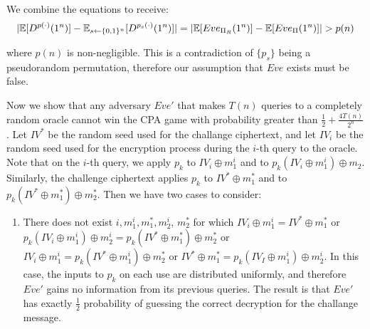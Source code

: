 \documentclass{article}
\begin{document}
\begin{enumerate}
\begin{enumerate}[,label=\alph*.]
We combine the equations to receive:%
\noindent\noindent\[%
|\E[D^{p(\cdot)}(1^n)] -  \E_{s \gets \zo^n}[D^{p_s(\cdot)}(1^n)] | = |\E[Eve_{\Pi_R}(1^n)] - \E[Eve_{\Pi}(1^n)] | > p(n)
\]%

where $p(n)$ is non-negligible. This is a contradiction of $\{p_s\}$ being a pseudorandom 
permutation, therefore our assumption that $Eve$ exists must be false.%

Now we show that any adversary $Eve'$ that makes $T(n)$ queries to a completely random oracle cannot
win the CPA game with probability greater than $\frac{1}{2} + \frac{4 T(n)}{2^n}$. Let $IV^*$ be the
random seed used for the challange ciphertext, and let $IV_i$ be the random seed used for the 
encryption process during the $i$-th query to the oracle. Note that on the $i$-th query, we apply
$p_k$ to $IV_i \oplus m^i_1$ and to $p_k(IV_i \oplus m^i_1) \oplus m_2$. Similarly, the challenge ciphertext
applies $p_k$ to $IV^* \oplus m_1^*$ and to $p_k(IV^* \oplus m_1^*) \oplus m_2^*$. Then we have two cases
to consider:%

\begin{enumerate}[noitemsep,topsep=\mdcompacttopsep]%

\item{}There does not exist $i, m^i_1, m_1^*, m^i_2$, $m_2^*$ for which $IV_i \oplus m^i_1 = IV^* \oplus m_1^*$
or $p_k(IV_i \oplus m^i_1) \oplus m^i_2 = p_k(IV^* \oplus m_1^*) \oplus m_2^*$ or $IV_i \oplus m^i_1 = p_k(IV^* \oplus m^i_1) \oplus m_2^*$ or $IV^* \oplus m_1^* = p_k(IV_I \oplus m^i_1) \oplus m^i_2$. In this
case, the inputs to $p_k$ on each use are distributed uniformly, and therefore $Eve'$ gains no 
information from its previous queries. The result is that $Eve'$ has exactly $\frac{1}{2}$ probability
of guessing the correct decryption for the challange message.%


\end{enumerate}
\end{enumerate}
\end{enumerate}
\end{document}
